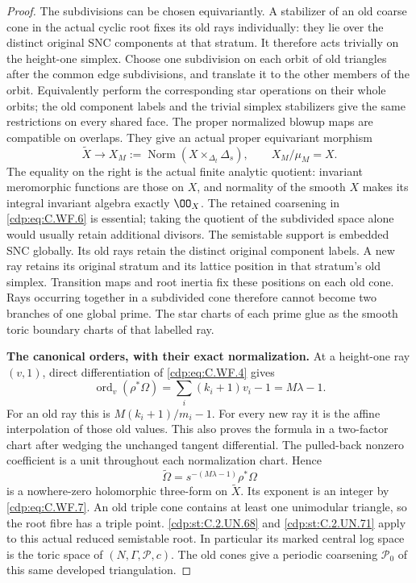 \begin{proof}
The subdivisions can be chosen equivariantly.  A stabilizer of an old
coarse cone in the actual cyclic root fixes its old rays
individually: they lie over the distinct original SNC
components at that stratum.  It therefore acts trivially on
the height-one simplex.  Choose one subdivision on each orbit
of old triangles after the common edge subdivisions, and
translate it to the other members of the orbit.  Equivalently
perform the corresponding star operations on their whole
orbits; the old component labels and the trivial simplex
stabilizers give the same restrictions on every shared face.
The proper normalized blowup maps are compatible on overlaps.  They give
an actual proper equivariant morphism
\[
 \widetilde X\longrightarrow X_M
       :=\operatorname{Norm}(X\times_{\Delta_t}\Delta_s),
 \qquad X_M/\mu_M=X.
\tag{C.WF.6}\label{cdp:eq:C.WF.6}
\]
The equality on the right is the actual finite analytic
quotient: invariant meromorphic functions are those on \(X\),
and normality of the smooth \(X\) makes its integral invariant
algebra exactly \(\OO_X\).  The retained coarsening in
\eqref{cdp:eq:C.WF.6} is essential; taking the quotient of the subdivided
space alone would usually retain additional divisors.
The semistable support is embedded SNC globally.  Its old
rays retain the distinct original component labels.  A new
ray retains its original stratum and its lattice position
in that stratum's old simplex.  Transition maps and root
inertia fix these positions on each old cone.  Rays occurring
together in a subdivided cone therefore cannot become two
branches of one global prime.  The star charts of each
prime glue as the smooth toric boundary charts of that
labelled ray.

\par\medskip\noindent\textbf{The canonical orders, with their exact normalization.}
At a height-one ray \((v,1)\), direct differentiation of
\eqref{cdp:eq:C.WF.4} gives
\[
 \operatorname{ord}_{v}(\rho^*\Omega)
       =\sum_i(k_i+1)v_i-1
       =M\lambda-1.
\tag{C.WF.7}\label{cdp:eq:C.WF.7}
\]
For an old ray this is \(M(k_i+1)/m_i-1\).
For every new ray it is the affine interpolation of those
old values.  This also proves the formula in a two-factor
chart after wedging the unchanged tangent differential.
The pulled-back nonzero coefficient is a unit throughout
each normalization chart.  Hence
\[
       \widetilde\Omega
          =s^{-(M\lambda-1)}\rho^*\Omega
\tag{C.WF.8}\label{cdp:eq:C.WF.8}
\]
is a nowhere-zero holomorphic three-form on \(\widetilde X\).
Its exponent is an integer by \eqref{cdp:eq:C.WF.7}.
An old triple cone contains at least one unimodular triangle,
so the root fibre has a triple point.  \ref{cdp:st:C.2.UN.68} and \ref{cdp:st:C.2.UN.71} apply to
this actual reduced semistable root.  In particular its marked
central log space is the toric space of
\((N,\Gamma,\mathscr P,c)\).  The old cones give a periodic
coarsening \(\mathscr P_0\) of this same developed triangulation.


\end{proof}
